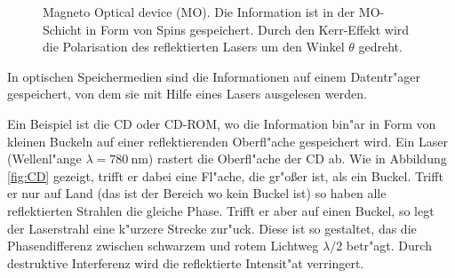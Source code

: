 \begin{figure}[htpb]
\begin{minipage}[t][][t]{0.48\textwidth}
        \caption{
            Magneto Optical device (MO).
            Die Information ist in der MO-Schicht in Form von Spins gespeichert.
            Durch den Kerr-Effekt wird die Polarisation des reflektierten Lasers um den Winkel $\theta$ gedreht.
        }
        \label{fig:MO}
    \end{minipage}
\end{figure}
In optischen Speichermedien sind die Informationen auf einem Datentr"ager gespeichert, von dem sie mit Hilfe eines Lasers ausgelesen werden.

Ein Beispiel ist die CD oder CD-ROM, wo die Information bin"ar in Form von kleinen Buckeln auf einer reflektierenden Oberfl"ache gespeichert wird.
Ein Laser (Wellenl"ange $\lambda=\SI{780}{\nano\metre}$) rastert die Oberfl"ache der CD ab.
Wie in Abbildung \vref{fig:CD} gezeigt, trifft er dabei eine Fl"ache, die gr"o{\ss}er ist, als ein Buckel.
Trifft er nur auf Land (das ist der Bereich wo kein Buckel ist) so haben alle reflektierten Strahlen die gleiche Phase.
Trifft er aber auf einen Buckel, so legt der Laserstrahl eine k"urzere Strecke zur"uck.
Diese ist so gestaltet, das die Phasendifferenz zwischen schwarzem und rotem Lichtweg $\lambda/2$ betr"agt.
Durch destruktive Interferenz wird die reflektierte Intensit"at verringert. \cite{wikicd}

